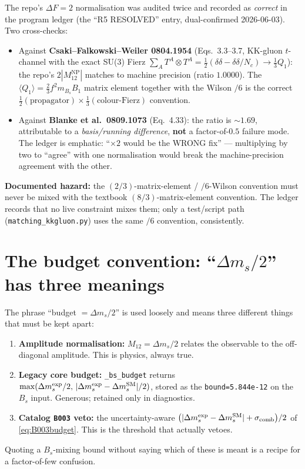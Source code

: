 \documentclass[11pt]{article}
\newcommand{\half}{\tfrac{1}{2}}
\newcommand{\code}[1]{\texttt{#1}}
\newcommand{\Bs}{B_s}
\newcommand{\dms}{\Delta m_s}
\newcommand{\Mtwelve}{M_{12}}
\newcommand{\MtwelveNP}{M_{12}^{\mathrm{NP}}}
\theoremstyle{definition}
\begin{document}
The repo's $\Delta F=2$ normalisation was audited twice and recorded as
\emph{correct} in the program ledger (the ``R5 RESOLVED'' entry, dual-confirmed
2026-06-03). Two cross-checks:
\begin{itemize}[leftmargin=1.4em]
\item Against \textbf{Csaki--Falkowski--Weiler 0804.1954} (Eqs.~3.3--3.7,
KK-gluon $t$-channel with the exact SU(3) Fierz
$\sum_A T^A\!\otimes T^A = \half(\delta\delta - \delta\delta/N_c)\to \tfrac13 Q_1$):
the repo's $2|\MtwelveNP|$ matches to machine precision (ratio $1.0000$). The
$\langle Q_1\rangle = \tfrac23 f^2 m_{\Bs} B_1$ matrix element together with the
Wilson $/6$ is the correct $\half(\text{propagator})\times\tfrac13(\text{colour-Fierz})$
convention.
\item Against \textbf{Blanke et al.\ 0809.1073} (Eq.~4.33): the ratio is
$\sim 1.69$, attributable to a \emph{basis/running difference}, \textbf{not} a
factor-of-$0.5$ failure mode. The ledger is emphatic: ``$\times 2$ would be the
WRONG fix'' --- multiplying by two to ``agree'' with one normalisation would
break the machine-precision agreement with the other.
\end{itemize}
\textbf{Documented hazard:} the $(2/3)$-matrix-element / $/6$-Wilson convention
must never be mixed with the textbook $(8/3)$-matrix-element convention. The
ledger records that no live constraint mixes them; only a test/script path
(\code{matching\_kkgluon.py}) uses the same $/6$ convention, consistently.

\section{The budget convention: ``$\dms/2$'' has three meanings}
\label{sec:budgetconv}

The phrase ``budget $=\dms/2$'' is used loosely and means three different things
that must be kept apart:
\begin{enumerate}[leftmargin=1.8em]
\item \textbf{Amplitude normalisation:} $\Mtwelve = \dms/2$ relates the
observable to the off-diagonal amplitude. This is physics, always true.
\item \textbf{Legacy core budget:} \code{\_bs\_budget} returns
$\max(\dms^{\rm exp}/2,\,|\dms^{\rm exp}-\dms^{\rm SM}|/2)$, stored as the
\code{bound=5.844e-12} on the $\Bs$ input. Generous; retained only in
diagnostics.
\item \textbf{Catalog \code{B003} veto:} the uncertainty-aware
$\big(|\dms^{\rm exp}-\dms^{\rm SM}|+\sigma_{\rm comb}\big)/2$ of
\eqref{eq:B003budget}. This is the threshold that actually vetoes.
\end{enumerate}
Quoting a $\Bs$-mixing bound without saying which of these is meant is a recipe
for a factor-of-few confusion.
\end{document}
